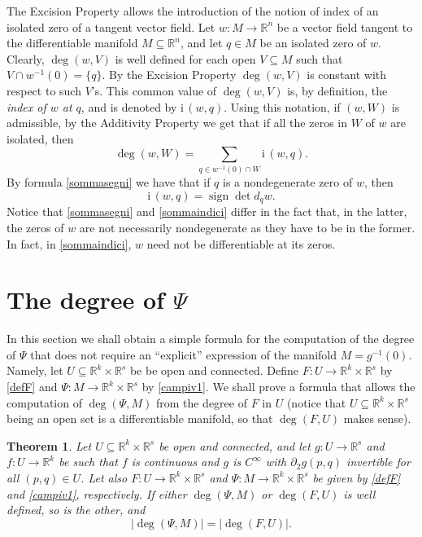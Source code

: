 \documentclass[a4paper]{amsart}
\numberwithin{equation}{section}
\newtheorem{theorem}{Theorem}[section]
\newcommand{\R}{\mathbb{R}}
\newcommand{\sign}{\mathop\mathrm{sign}\nolimits}
\begin{document}
The Excision Property allows the introduction of the notion of index of an isolated zero 
of a tangent vector field. Let $w:M\to\R^n$ be a vector field tangent to the differentiable 
manifold $M\subseteq\R^n$, and let $q\in M$ be an isolated zero of $w$. Clearly, $\deg(w,V)$ 
is well defined for each open $V\subseteq M$ such that $V\cap w^{-1}(0)=\{ q\}$. By the 
Excision Property $\deg(w,V)$ is constant with respect to such $V$'s. This common value of 
$\deg(w,V)$ is, by definition, the \emph{index of $w$ at $ q$}, and is denoted by 
$\mathrm{i}\,(w, q)$. Using this notation, if $(w,W)$ is admissible, by the Additivity 
Property we get that if all the zeros in $W$ of $w$ are isolated, then
\begin{equation}\label{sommaindici}
\deg(w,W)=\sum_{q\in w^{-1}(0)\cap W} \mathrm{i}\,(w,q).
\end{equation}
By formula \eqref{sommasegni} we have that if $q$ is a nondegenerate zero of $w$, then
\[
 \mathrm{i}\,(w,q)=\sign\det d_ q w.
\]
Notice that \eqref{sommasegni} and \eqref{sommaindici} differ in the fact that, in the
latter, the zeros of $w$ are not necessarily nondegenerate as they have to be in the former. 
In fact, in \eqref{sommaindici}, $w$ need not be differentiable at its zeros.


\section{The degree of $\Psi$}

In this section we shall obtain a simple formula for the computation of the degree of $\Psi$ 
that does not require an ``explicit'' expression of the manifold $M=g^{-1}(0)$.  Namely,
let $U\subseteq\R^k\times\R^s$ be be open and connected. Define $F:U\to\R^k\times\R^s$ 
by \eqref{defF} and $\Psi:M\to\R^k\times\R^s$ by \eqref{campiv1}. We shall prove 
a formula that allows the computation of $\deg(\Psi,M)$ from the degree of $F$ in $U$ 
(notice that $U\subseteq\R^k\times\R^s$ being an open set is a differentiable manifold, so 
that $\deg(F,U)$ makes sense).

\begin{theorem}\label{formuladeg}
Let $U\subseteq\R^k\times\R^s$ be open and connected, and let $g:U\to\R^s$ and $f:U\to\R^k$ 
be such that $f$ is continuous and $g$ is $C^\infty$ with $\partial_2g(p,q)$ invertible 
for all $(p,q)\in U$. Let also $F:U\to\R^k\times\R^s$ and $\Psi:M\to\R^k\times\R^s$ be given 
by \eqref{defF} and \eqref{campiv1}, respectively. If either $\deg(\Psi,M)$ or $\deg(F,U)$ 
is well defined, so is the other, and
\begin{equation}\label{idgradi}
 \big|\deg(\Psi,M)\big|=\big|\deg(F,U)\big|.
\end{equation}
\end{theorem}
\end{document}
